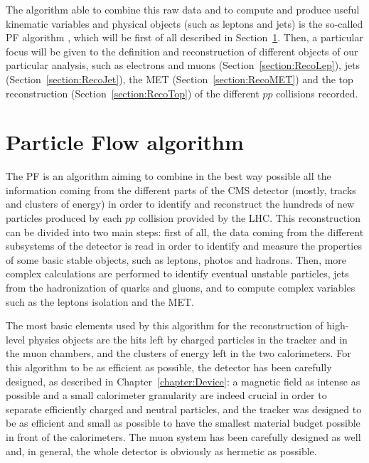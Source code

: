 \documentclass[a4paper, 10pt, openright]{report}
\begin{document}
The algorithm able to combine this raw data and to compute and produce useful kinematic variables and physical objects (such as leptons and jets) is the so-called \acf{PF} algorithm \cite{PF}, which will be first of all described in Section~\ref{section:PF}. Then, a particular focus will be given to the definition and reconstruction of different objects of our particular analysis, such as electrons and muons (Section~\ref{section:RecoLep}), jets (Section~\ref{section:RecoJet}), the \ac{MET} (Section~\ref{section:RecoMET}) and the top reconstruction (Section~\ref{section:RecoTop}) of the different $pp$ collisions recorded.

\section{Particle Flow algorithm} \label{section:PF}

The \ac{PF} is an algorithm aiming to combine in the best way possible all the information coming from the different parts of the \ac{CMS} detector (mostly, tracks and clusters of energy) in order to identify and reconstruct the hundreds of new particles produced by each $pp$ collision provided by the \ac{LHC}. This reconstruction can be divided into two main steps: first of all, the data coming from the different subsystems of the detector is read in order to identify and measure the properties of some basic stable objects, such as leptons, photos and hadrons. Then, more complex calculations are performed to identify eventual unstable particles, jets from the hadronization of quarks and gluons, and to compute complex variables such as the leptons isolation and the \ac{MET}.

The most basic elements used by this algorithm for the reconstruction of high-level physics objects are the hits left by charged particles in the tracker and in the muon chambers, and the clusters of energy left in the two calorimeters. For this algorithm to be as efficient as possible, the detector has been carefully designed, as described in Chapter~\ref{chapter:Device}: a magnetic field as intense as possible and a small calorimeter granularity are indeed crucial in order to separate efficiently charged and neutral particles, and the tracker was designed to be as efficient and small as possible to have the smallest material budget possible in front of the calorimeters. The muon system has been carefully designed as well and, in general, the whole detector is obviously as hermetic as possible.
\end{document}
